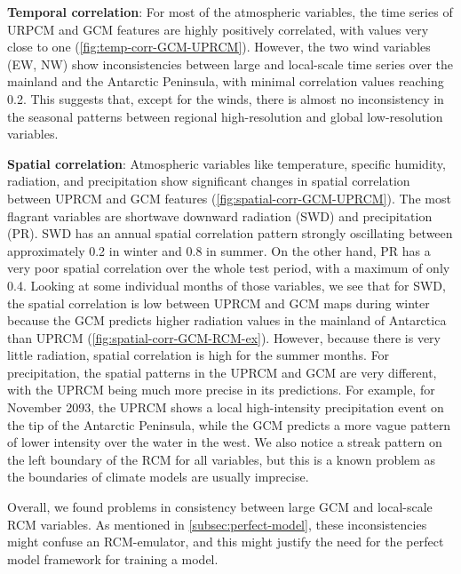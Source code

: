 \documentclass[a4paper,11pt,oneside]{report}
\begin{document}
\textbf{Temporal correlation}: For most of the atmospheric variables, the time series of URPCM and GCM features are highly positively correlated, with values very close to one (\autoref{fig:temp-corr-GCM-UPRCM}). However, the two wind variables (EW, NW) show inconsistencies between large and local-scale time series over the mainland and the Antarctic Peninsula, with minimal correlation values reaching 0.2. This suggests that, except for the winds, there is almost no inconsistency in the seasonal patterns between regional high-resolution and global low-resolution variables. 

\textbf{Spatial correlation}: Atmospheric variables like temperature, specific humidity, radiation, and precipitation show significant changes in spatial correlation between UPRCM and GCM features (\autoref{fig:spatial-corr-GCM-UPRCM}). The most flagrant variables are shortwave downward radiation (SWD) and precipitation (PR). SWD has an annual spatial correlation pattern strongly oscillating between approximately 0.2 in winter and 0.8 in summer. On the other hand, PR has a very poor spatial correlation over the whole test period, with a maximum of only 0.4. Looking at some individual months of those variables, we see that for SWD, the spatial correlation is low between UPRCM and GCM maps during winter because the GCM predicts higher radiation values in the mainland of Antarctica than UPRCM (\autoref{fig:spatial-corr-GCM-RCM-ex}). However, because there is very little radiation, spatial correlation is high for the summer months. For precipitation, the spatial patterns in the UPRCM and GCM are very different, with the UPRCM being much more precise in its predictions. For example, for November 2093, the UPRCM shows a local high-intensity precipitation event on the tip of the Antarctic Peninsula, while the GCM predicts a more vague pattern of lower intensity over the water in the west. We also notice a streak pattern on the left boundary of the RCM for all variables, but this is a known problem as the boundaries of climate models are usually imprecise. 

Overall, we found problems in consistency between large GCM and local-scale RCM variables. As mentioned in \autoref{subsec:perfect-model}, these inconsistencies might confuse an RCM-emulator, and this might justify the need for the perfect model framework for training a model. 
\end{document}
